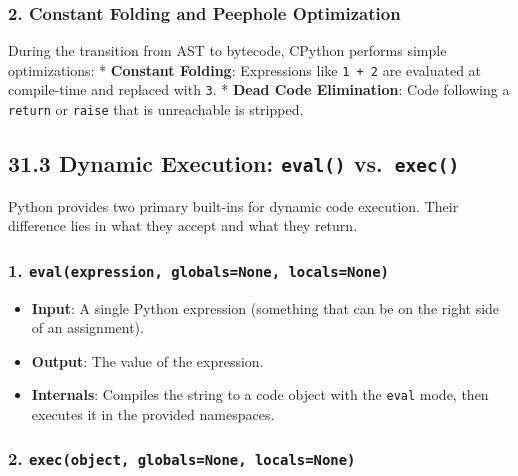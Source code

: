 \hypertarget{constant-folding-and-peephole-optimization}{%
\subsubsection{2. Constant Folding and Peephole
Optimization}\label{constant-folding-and-peephole-optimization}}

During the transition from AST to bytecode, CPython performs simple
optimizations: * \textbf{Constant Folding}: Expressions like
\passthrough{\lstinline!1 + 2!} are evaluated at compile-time and
replaced with \passthrough{\lstinline!3!}. * \textbf{Dead Code
Elimination}: Code following a \passthrough{\lstinline!return!} or
\passthrough{\lstinline!raise!} that is unreachable is stripped.

\hypertarget{dynamic-execution-eval-vs.-exec}{%
\subsection{\texorpdfstring{31.3 Dynamic Execution: \texttt{eval()}
vs.~\texttt{exec()}}{31.3 Dynamic Execution: eval() vs.~exec()}}\label{dynamic-execution-eval-vs.-exec}}

Python provides two primary built-ins for dynamic code execution. Their
difference lies in what they accept and what they return.

\hypertarget{evalexpression-globalsnone-localsnone}{%
\subsubsection{\texorpdfstring{1.
\texttt{eval(expression,\ globals=None,\ locals=None)}}{1. eval(expression, globals=None, locals=None)}}\label{evalexpression-globalsnone-localsnone}}

\begin{itemize}
\tightlist
\item
  \textbf{Input}: A single Python expression (something that can be on
  the right side of an assignment).
\item
  \textbf{Output}: The value of the expression.
\item
  \textbf{Internals}: Compiles the string to a code object with the
  \passthrough{\lstinline!eval!} mode, then executes it in the provided
  namespaces.
\end{itemize}

\hypertarget{execobject-globalsnone-localsnone}{%
\subsubsection{\texorpdfstring{2.
\texttt{exec(object,\ globals=None,\ locals=None)}}{2. exec(object, globals=None, locals=None)}}\label{execobject-globalsnone-localsnone}}

